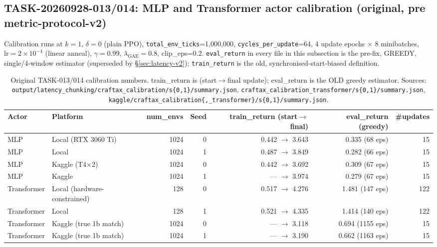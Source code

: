 \documentclass[11pt]{article}
\newcommand{\srcpath}[1]{\texttt{\small #1}}
\begin{document}
\subsection{TASK-20260928-013/014: MLP and Transformer actor calibration (original, pre metric-protocol-v2)}

Calibration runs at $k=1$, $\delta=0$ (plain PPO), \texttt{total\_env\_ticks}=1{,}000{,}000,
\texttt{cycles\_per\_update}=64, 4 update epochs $\times$ 8 minibatches, $\text{lr}=2\times10^{-4}$
(linear anneal), $\gamma=0.99$, $\lambda_{\text{GAE}}=0.8$, clip\_eps=0.2. \texttt{eval\_return} in
every file in this subsection is the pre-fix, GREEDY, single/4-window estimator (superseded by
\S\ref{sec:latency-v2}); \texttt{train\_return} is the old, synchronised-start-biased definition.

\begin{table}[h]
\centering
\caption{Original TASK-013/014 calibration numbers. train\_return is (start$\to$final update); eval\_return is the OLD greedy estimator. Sources: \srcpath{output/latency\_chunking/craftax\_calibration/s\{0,1\}/summary.json}, \srcpath{craftax\_calibration\_transformer/s\{0,1\}/summary.json}, \srcpath{kaggle/craftax\_calibration\{,\_transformer\}/s\{0,1\}/summary.json}.}
\begin{tabular}{llrrrrr}
\toprule
Actor & Platform & num\_envs & Seed & train\_return (start$\to$final) & eval\_return (greedy) & \#updates \\
\midrule
MLP & Local (RTX 3060 Ti) & 1024 & 0 & 0.442 $\to$ 3.643 & 0.335 (68 eps) & 15 \\
MLP & Local & 1024 & 1 & 0.487 $\to$ 3.849 & 0.282 (66 eps) & 15 \\
MLP & Kaggle (T4$\times$2) & 1024 & 0 & 0.442 $\to$ 3.692 & 0.309 (67 eps) & 15 \\
MLP & Kaggle & 1024 & 1 & --- $\to$ 3.974 & 0.279 (67 eps) & 15 \\
Transformer & Local (hardware-constrained) & 128 & 0 & 0.517 $\to$ 4.276 & 1.481 (147 eps) & 122 \\
Transformer & Local & 128 & 1 & 0.521 $\to$ 4.335 & 1.414 (140 eps) & 122 \\
Transformer & Kaggle (true 1b match) & 1024 & 0 & --- $\to$ 3.118 & 0.694 (1155 eps) & 15 \\
Transformer & Kaggle (true 1b match) & 1024 & 1 & --- $\to$ 3.190 & 0.662 (1163 eps) & 15 \\
\bottomrule
\end{tabular}
\end{table}
\end{document}
